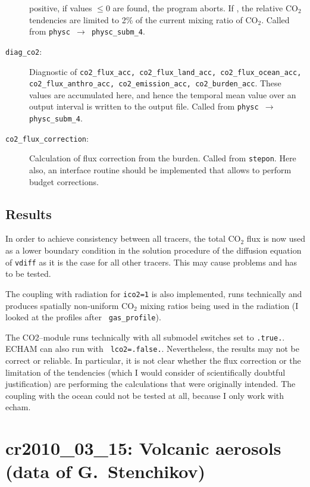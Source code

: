\begin{appendix}
\begin{description}
  positive, if values $\le 0$ are found, the program aborts. If
  , the relative CO$_2$ tendencies are limited to
  2\% of the current mixing ratio of CO$_2$. Called from {\tt physc
    $\rightarrow$ physc\_subm\_4}. 
\item [{\tt diag\_co2}:] Diagnostic of {\tt co2\_flux\_acc,
    co2\_flux\_land\_acc, co2\_flux\_ocean\_acc,
    co2\_flux\_anthro\_acc, \newline co2\_emission\_acc,
    co2\_burden\_acc}. These values are accumulated here, and hence the
  temporal mean value over an output interval is written to the output
  file. Called from {\tt physc $\rightarrow$ physc\_subm\_4}.
\item [{\tt co2\_flux\_correction}:] Calculation of flux correction
  from the burden. Called from {\tt stepon}. Here also, an interface
  routine should be implemented that allows to perform budget
  corrections. 
\end{description}

\subsection{Results}

In order to achieve consistency between all tracers, the total
CO$_2$ flux is now used as a lower boundary condition in the solution
procedure of the diffusion equation of {\tt vdiff} as it is the case
for all other tracers. This may cause problems and has to be tested.

The coupling with radiation for {\tt ico2=1} is also implemented, runs
technically and produces spatially non-uniform CO$_2$ mixing ratios
being used in the radiation (I looked at the profiles after {\tt
  gas\_profile}). 

The CO2--module runs technically with all submodel switches set
to {\tt .true.}. ECHAM can also run with {\tt
  lco2=.false.}. Nevertheless, the results may not be correct or
reliable. In particular, it is not clear whether the flux correction
or the limitation of the tendencies (which I would consider of
scientifically doubtful justification) are performing the calculations
that were originally intended. The coupling with the ocean could not
be tested at all, because I only work with echam. 

\clearpage\newpage
\section[cr2010\_03\_15: Volcanic Stenchikov aerosols]{cr2010\_03\_15: Volcanic aerosols (data of G.~Stenchikov)}\label{cr20100315}


\end{appendix}
